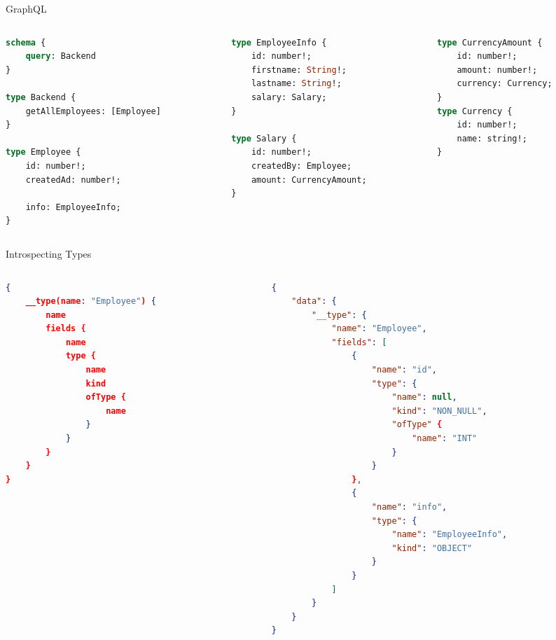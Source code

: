 \documentclass[aspectratio=169,notes]{beamer}
\begin{document}
	\begin{frame}[fragile]{GraphQL}
		\hspace{2mm}%
		\begin{columns}[t]
			\begin{column}{0.38\textwidth}
		\begin{lstlisting}[language=GraphQL,basicstyle=\scriptsize\ttfamily]
schema {
	query: Backend
}

type Backend {
	getAllEmployees: [Employee]
}

type Employee {
	id: number!;
	createdAd: number!;

	info: EmployeeInfo;
}	
\end{lstlisting}
			\end{column}
			\begin{column}{0.33\textwidth}
		\begin{lstlisting}[language=GraphQL,basicstyle=\scriptsize\ttfamily,firstnumber=15]
type EmployeeInfo {
	id: number!;
	firstname: String!;
	lastname: String!;
	salary: Salary;
}	

type Salary {
	id: number!;
	createdBy: Employee;
	amount: CurrencyAmount;
}
\end{lstlisting}
			\end{column}

			\begin{column}{0.29\textwidth}
		\begin{lstlisting}[language=GraphQL,basicstyle=\scriptsize\ttfamily,firstnumber=27]
type CurrencyAmount {
	id: number!;
	amount: number!;
	currency: Currency;
}
type Currency {
	id: number!;
	name: string!;
}
\end{lstlisting}
			\end{column}
		\end{columns}
\end{frame}

	\begin{frame}[fragile]{Introspecting Types}
		\vspace{-7mm}	
		\begin{columns}[t]
			\begin{column}{0.5\textwidth}
				\begin{lstlisting}[language=json,basicstyle=\scriptsize\ttfamily]
{
	__type(name: "Employee") {
		name
		fields {
			name
			type {
				name
				kind
				ofType {
					name
				}
			}
		}
	}
}
\end{lstlisting}	
			\end{column}
			\begin{column}{0.5\textwidth}
				\begin{lstlisting}[language=json,basicstyle=\scriptsize\ttfamily]
{
	"data": {
		"__type": {
			"name": "Employee",
			"fields": [
				{
					"name": "id",
					"type": {
						"name": null,
						"kind": "NON_NULL",
						"ofType" {
							"name": "INT"
						}
					}
				},
				{
					"name": "info",
					"type": {
						"name": "EmployeeInfo",
						"kind": "OBJECT"
					}
				}
			]
		}
	}
}
\end{lstlisting}	
			\end{column}
			
		\end{columns}
	\end{frame}
\end{document}
